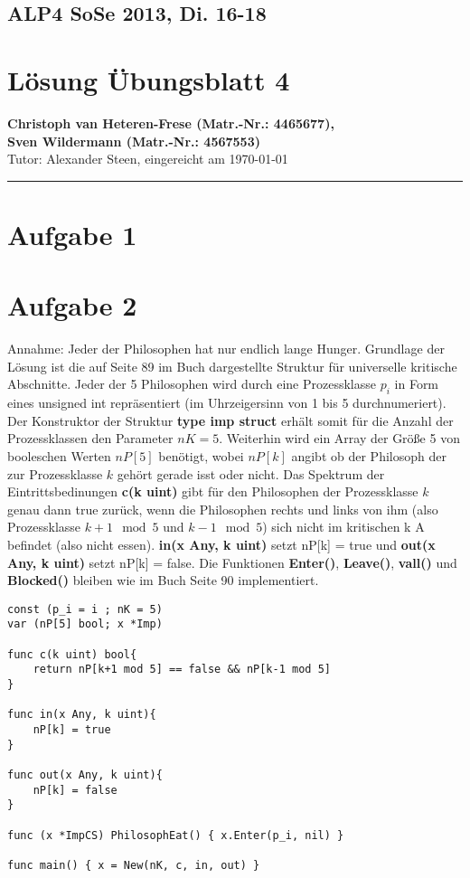 \documentclass[11pt,a4paper,DIV=10,]{scrartcl}
\begin{document}
\subsection*{ALP4 SoSe 2013, Di. 16-18}
\section*{Lösung Übungsblatt 4}
\textbf{Christoph van Heteren-Frese (Matr.-Nr.: 4465677), \\ Sven Wildermann (Matr.-Nr.: 4567553)}\\
Tutor: Alexander Steen, eingereicht am \today\\
\hrule
\section*{Aufgabe 1}


\section*{Aufgabe 2}
Annahme: Jeder der Philosophen hat nur endlich lange Hunger. 
Grundlage der Lösung ist die auf Seite 89 im Buch dargestellte Struktur für universelle kritische Abschnitte. Jeder der 5 Philosophen wird durch eine Prozessklasse $p_i$ in Form eines unsigned int repräsentiert (im Uhrzeigersinn von 1 bis 5 durchnumeriert). Der Konstruktor der Struktur \textbf{type imp struct} erhält somit für die Anzahl der Prozessklassen den Parameter $nK=5$. Weiterhin wird ein Array der Größe 5 von booleschen Werten $nP[5]$ benötigt, wobei $nP[k]$ angibt ob der Philosoph der zur Prozessklasse $k$ gehört gerade isst oder nicht.   Das Spektrum der Eintrittsbedinungen \textbf{c(k uint)} gibt für den Philosophen der Prozessklasse $k$ genau dann true zurück, wenn die Philosophen rechts und links von ihm (also Prozessklasse $k+1 \mod 5$ und $k-1 \mod 5$) sich nicht im kritischen k A befindet (also nicht essen). \textbf{in(x Any, k uint)} setzt nP[k] = true und \textbf{out(x Any, k uint)} setzt nP[k] = false. Die Funktionen \textbf{Enter()}, \textbf{Leave()}, \textbf{vall()} und \textbf{Blocked()
} bleiben wie im Buch Seite 90 implementiert.

\begin{lstlisting} 
const (p_i = i ; nK = 5)
var (nP[5] bool; x *Imp)

func c(k uint) bool{
	return nP[k+1 mod 5] == false && nP[k-1 mod 5]
}

func in(x Any, k uint){
	nP[k] = true	
}

func out(x Any, k uint){
	nP[k] = false
}

func (x *ImpCS) PhilosophEat() { x.Enter(p_i, nil) }

func main() { x = New(nK, c, in, out) }


\end{lstlisting}
\end{document}
